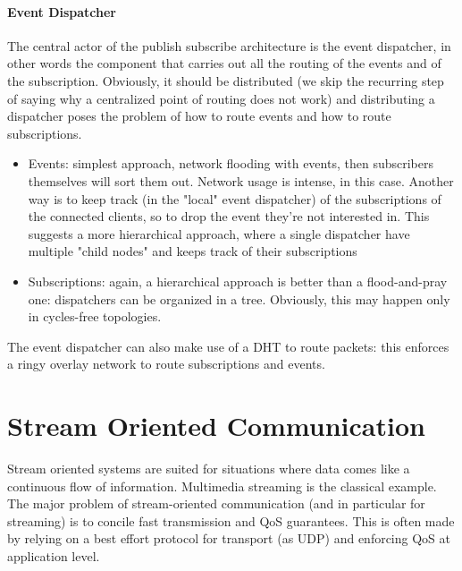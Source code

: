 \documentclass[10pt,a4paper]{article}
\begin{document}
				\paragraph{Event Dispatcher}
					The central actor of the publish subscribe architecture is the event dispatcher, in other words the component that carries out all the routing of the events and of the subscription. Obviously, it should be distributed (we skip the recurring step of saying why a centralized point of routing does not work) and distributing a dispatcher poses the problem of how to route events and how to route subscriptions.\\
					\begin{itemize}
						\item Events: simplest approach, network flooding with events, then subscribers themselves will sort them out. Network usage is intense, in this case. Another way is to keep track (in the "local" event dispatcher) of the subscriptions of the connected clients, so to drop the event they're not interested in. This suggests a more hierarchical approach, where a single dispatcher have multiple "child nodes" and keeps track of their subscriptions
						\item Subscriptions: again, a hierarchical approach is better than a flood-and-pray one: dispatchers can be organized in a tree. Obviously, this may happen only in cycles-free topologies. 
					\end{itemize}
					The event dispatcher can also make use of a DHT to route packets: this enforces a ringy overlay network to route subscriptions and events.
			
		\section{Stream Oriented Communication}
			Stream oriented systems are suited for situations where data comes like a continuous flow of information. Multimedia streaming is the classical example. The major problem of stream-oriented communication (and in particular for streaming) is to concile fast transmission and QoS guarantees. This is often made by relying on a best effort protocol for transport (as UDP) and enforcing QoS at application level.
			
\end{document}
